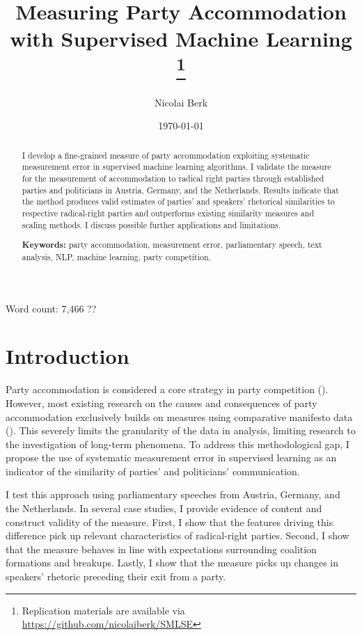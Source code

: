 \documentclass{article}
\title{Measuring Party Accommodation with Supervised Machine Learning
\footnote{Replication materials are available via \href{https://github.com/nicolaiberk/SMLSE}{https://github.com/nicolaiberk/SMLSE}}
}
\author{Nicolai Berk}
\date{\today}
\begin{document}
\maketitle

\begin{abstract}
I develop a fine-grained measure of party accommodation exploiting systematic measurement error in supervised machine learning algorithms. I validate the measure for the measurement of accommodation to radical right parties through established parties and politicians in Austria, Germany, and the Netherlands. Results indicate that the method produces valid estimates of parties' and speakers' rhetorical similarities to respective radical-right parties and outperforms existing similarity measures and scaling methods. I discuss possible further applications and limitations.\par \medskip


\textbf{Keywords:} party accommodation, measurement error, parliamentary speech, text analysis, NLP, machine learning, party competition.
\end{abstract}

\begin{center}
Word count: 7,466 ??
\end{center}

\section{Introduction}
\label{sec:Intro}

Party accommodation is considered a core strategy in party competition (\cite{Meguid2005}). However, most existing research on the causes and consequences of party accommodation exclusively builds on measures using comparative manifesto data (\cite{krause2023does, Spoon2020, Lehmann2022CMP}). This severely limits the granularity of the data in analysis, limiting research to the investigation of long-term phenomena. To address this methodological gap, I propose the use of systematic measurement error in supervised learning as an indicator of the similarity of parties' and politicians' communication. 


I test this approach using parliamentary speeches from Austria, Germany, and the Netherlands. In several case studies, I provide evidence of content and construct validity of the measure. First, I show that the features driving this difference pick up relevant characteristics of radical-right parties. Second, I show that the measure behaves in line with expectations surrounding coalition formations and breakups. Lastly, I show that the measure picks up changes in speakers' rhetoric preceding their exit from a party.
\end{document}
